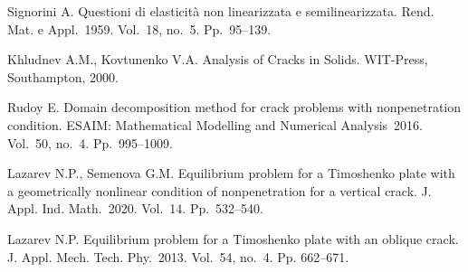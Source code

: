 \documentclass[12pt]{llncs}
\begin{document}





\begin{thebibliography}{9} %

 Signorini  A. Questioni di elasticità
non linearizzata e semilinearizzata. Rend. Mat. e Appl.~1959.
Vol.~18, no.~5. Pp.~95--139.


 Khludnev A.M., Kovtunenko V.A. {Analysis of Cracks in Solids.}
WIT-Press, Southampton, 2000.

 Rudoy E. Domain decomposition method for crack problems with
nonpenetration condition. ESAIM: Mathematical Modelling and
Numerical Analysis~2016. Vol.~50, no.~4. Pp.~995--1009.

 Lazarev N.P., Semenova G.M. Equilibrium problem for a Timoshenko
plate with a geometrically nonlinear condition of nonpenetration
for a vertical crack. J. Appl. Ind. Math.~2020. Vol.~14.
Pp.~532--540.

 Lazarev N.P. Equilibrium problem for a Timoshenko plate with an
oblique crack. J. Appl. Mech. Tech. Phy.~2013. Vol.~54, no.~4. Pp.
662--671.


\end{thebibliography}
\end{document}
